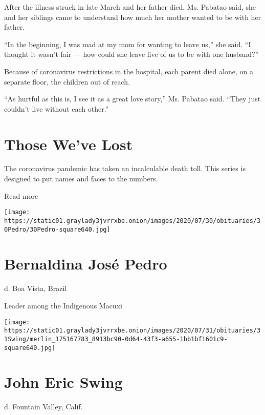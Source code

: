 After the illness struck in late March and her father died, Ms. Pabatao
said, she and her siblings came to understand how much her mother wanted
to be with her father.

``In the beginning, I was mad at my mom for wanting to leave us,'' she
said. ``I thought it wasn't fair --- how could she leave five of us to
be with one husband?''

Because of coronavirus restrictions in the hospital, each parent died
alone, on a separate floor, the children out of reach.

``As hurtful as this is, I see it as a great love story,'' Ms. Pabatao
said. ``They just couldn't live without each other.''

\href{https://www.nytimes3xbfgragh.onion/interactive/2020/obituaries/people-died-coronavirus-obituaries.html?action=click\&pgtype=Article\&state=default\&region=BELOW_MAIN_CONTENT\&context=covid_obits_promo}{}

\hypertarget{those-weve-lost}{%
\section{Those We've Lost}\label{those-weve-lost}}

The coronavirus pandemic has taken an incalculable death toll. This
series is designed to put names and faces to the numbers.

Read more

\texttt{[image: https://static01.graylady3jvrrxbe.onion/images/2020/07/30/obituaries/30Pedro/30Pedro-square640.jpg]}

\hypertarget{bernaldina-josuxe9-pedro}{%
\section{Bernaldina José Pedro}\label{bernaldina-josuxe9-pedro}}

d. Boa Vista, Brazil

Leader among the Indigenous Macuxi

\texttt{[image: https://static01.graylady3jvrrxbe.onion/images/2020/07/31/obituaries/31Swing/merlin\_175167783\_8913bc90-0d64-43f3-a655-1bb1bf1601c9-square640.jpg]}

\hypertarget{john-eric-swing}{%
\section{John Eric Swing}\label{john-eric-swing}}

d. Fountain Valley, Calif.

